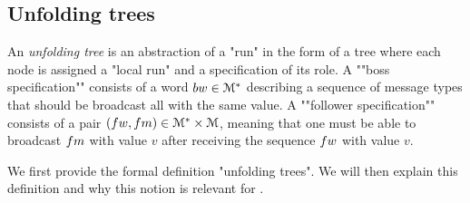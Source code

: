 %	


\subsection{Unfolding trees}
\label{sec:decidability-tree-unfoldings}

An \emph{unfolding tree} is an abstraction of a "run" in the form of a tree where each node is assigned a "local run" and a specification of its role. A ""boss specification"" consists of a word $\bossspec \in \messages^*$ describing a sequence of message types that should be broadcast all with the same value. A ""follower specification"" consists of a pair $(\followwordspec, \followmessagespec) \in \messages^*\times \messages$, meaning that one must be able to broadcast $\followmessagespec$ with value $v$ after receiving the sequence $\followwordspec$ with value $v$. 

We first provide the formal definition "unfolding trees". We will then explain this definition and why this notion is relevant for \COVER. 

